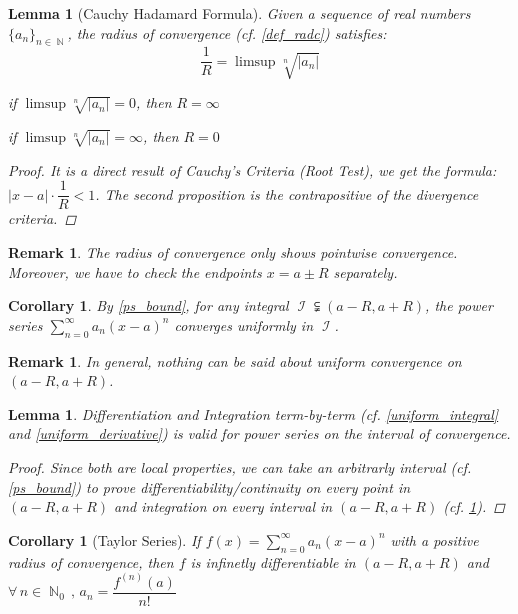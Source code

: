 \documentclass[12pt]{article}
\newcommand{\Forall}[1]{\forall\,{#1}\,,\,}
\DeclareMathOperator{\N}{\mathbb{N}}
\DeclareMathOperator{\I}{\mathcal{I}}
\newcommand{\seq}[2]{\{{#1}\}_{#2\in\N}}
\newtheorem{lemma}[theorem]{Lemma}
\newtheorem{corollary}[theorem]{Corollary}
\newtheorem{remark}[theorem]{Remark}
\begin{document}
\begin{lemma}[Cauchy Hadamard Formula]
  \label{cauchy_hadamard}
  Given a sequence of real numbers $\seq{a_n}{n}$, the radius of convergence (cf. \ref{def_radc}) satisfies: $$\frac{1}{R}=\limsup\sqrt[n]{|a_n|}$$
  \begin{compactitem}
    \item[] if $\limsup\sqrt[n]{|a_n|}=0$, then $R=\infty$
    \item[] if $\limsup\sqrt[n]{|a_n|}=\infty$, then $R=0$
  \end{compactitem}
  \begin{proof}
    It is a direct result of Cauchy's Criteria (Root Test), we get the formula: $|x-a|\cdot\dfrac{1}{R}<1$. The second proposition is the contrapositive of the divergence criteria.
  \end{proof}
\end{lemma}

\begin{remark}
  The radius of convergence only shows pointwise convergence. Moreover, we have to check the endpoints $x=a\pm R$ separately.
\end{remark}

\begin{corollary}
  \label{ps_interval}
  By \ref{ps_bound}, for any integral $\I\subsetneqq (a-R,a+R)$, the power series $\sum_{n=0}^\infty a_n(x-a)^n$ converges uniformly in $\I$.
\end{corollary}

\begin{remark}
  In general, nothing can be said about uniform convergence on $(a-R,a+R)$.
\end{remark}

\begin{lemma}
  Differentiation and Integration term-by-term (cf. \ref{uniform_integral} and \ref{uniform_derivative}) is valid for power series on the interval of convergence.
  \begin{proof}
    Since both are local properties, we can take an arbitrarly interval (cf. \ref{ps_bound}) to prove differentiability/continuity on every point in $(a-R,a+R)$ and integration on every interval in $(a-R,a+R)$ (cf. \ref{ps_interval}).
  \end{proof}
\end{lemma}

\begin{corollary}[Taylor Series]
  If $f(x)=\sum_{n=0}^\infty a_n(x-a)^n$ with a positive radius of convergence, then $f$ is infinetly differentiable in $(a-R,a+R)$ and $\Forall{n\in\N_0}a_n=\dfrac{f^{(n)}(a)}{n!}$
\end{corollary}
\end{document}
